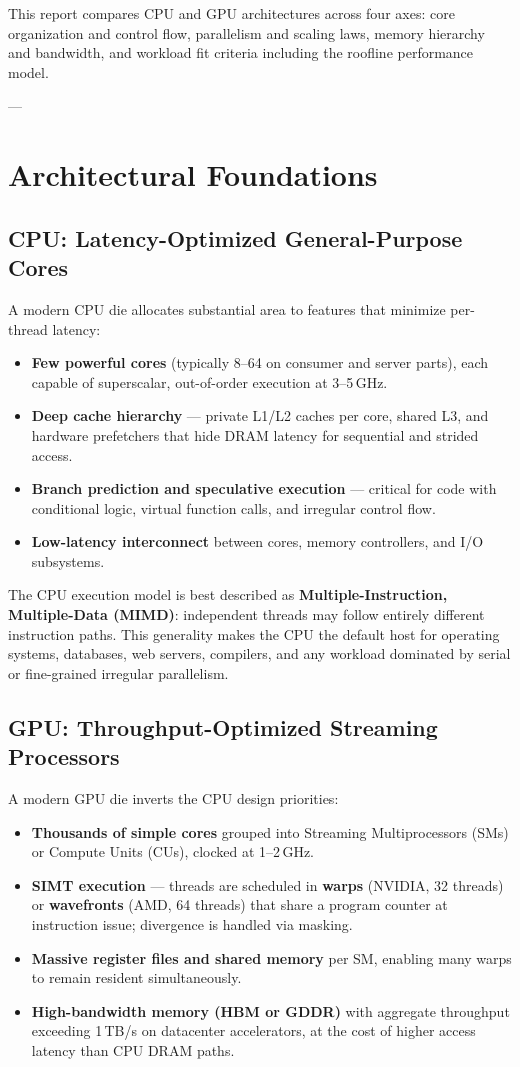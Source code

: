 \documentclass[11pt,journal,onecolumn]{IEEEtran}
\begin{document}
This report compares CPU and GPU architectures across four axes: core organization and control flow, parallelism and scaling laws, memory hierarchy and bandwidth, and workload fit criteria including the roofline performance model.

---

\section{Architectural Foundations}

\subsection{CPU: Latency-Optimized General-Purpose Cores}
A modern CPU die allocates substantial area to features that minimize per-thread latency:
\begin{itemize}
    \item \textbf{Few powerful cores} (typically 8--64 on consumer and server parts), each capable of superscalar, out-of-order execution at 3--5\,GHz.
    \item \textbf{Deep cache hierarchy} --- private L1/L2 caches per core, shared L3, and hardware prefetchers that hide DRAM latency for sequential and strided access.
    \item \textbf{Branch prediction and speculative execution} --- critical for code with conditional logic, virtual function calls, and irregular control flow.
    \item \textbf{Low-latency interconnect} between cores, memory controllers, and I/O subsystems.
\end{itemize}

The CPU execution model is best described as \textbf{Multiple-Instruction, Multiple-Data (MIMD)}: independent threads may follow entirely different instruction paths. This generality makes the CPU the default host for operating systems, databases, web servers, compilers, and any workload dominated by serial or fine-grained irregular parallelism.

\subsection{GPU: Throughput-Optimized Streaming Processors}
A modern GPU die inverts the CPU design priorities:
\begin{itemize}
    \item \textbf{Thousands of simple cores} grouped into Streaming Multiprocessors (SMs) or Compute Units (CUs), clocked at 1--2\,GHz.
    \item \textbf{SIMT execution} --- threads are scheduled in \textbf{warps} (NVIDIA, 32 threads) or \textbf{wavefronts} (AMD, 64 threads) that share a program counter at instruction issue; divergence is handled via masking.
    \item \textbf{Massive register files and shared memory} per SM, enabling many warps to remain resident simultaneously.
    \item \textbf{High-bandwidth memory (HBM or GDDR)} with aggregate throughput exceeding 1\,TB/s on datacenter accelerators, at the cost of higher access latency than CPU DRAM paths.
\end{itemize}
\end{document}
